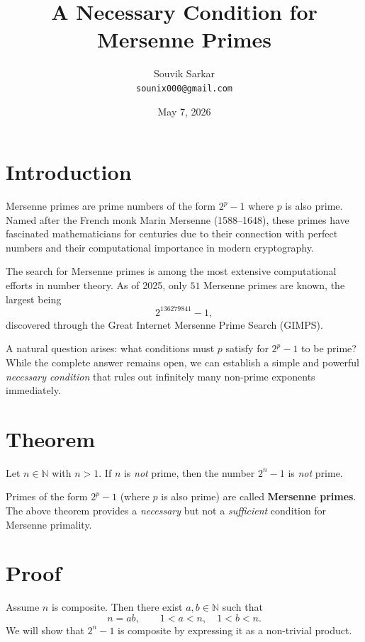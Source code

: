 \documentclass[11pt]{article}
\title{\textbf{A Necessary Condition for Mersenne Primes}}
\author{Souvik Sarkar \\ \texttt{sounix000@gmail.com}}
\date{May 7, 2026}
\begin{document}
\maketitle

\section*{Introduction}

Mersenne primes are prime numbers of the form $2^p - 1$ where $p$ is also prime. Named after the French monk Marin Mersenne (1588–1648), these primes have fascinated mathematicians for centuries due to their connection with perfect numbers and their computational importance in modern cryptography.

The search for Mersenne primes is among the most extensive computational efforts in number theory. As of 2025, only $51$ Mersenne primes are known, the largest being
\[
2^{136279841} - 1,
\]
discovered through the Great Internet Mersenne Prime Search (GIMPS).

A natural question arises: what conditions must $p$ satisfy for $2^p - 1$ to be prime? While the complete answer remains open, we can establish a simple and powerful \emph{necessary condition} that rules out infinitely many non-prime exponents immediately.

\section*{Theorem}

\begin{tcolorbox}[colback=blue!3!white, colframe=blue!60!black, title=\textbf{Main Theorem}]
Let $n \in \mathbb{N}$ with $n>1$. If $n$ is \emph{not} prime, then the number $2^n - 1$ is \emph{not} prime.
\end{tcolorbox}

\noindent
Primes of the form $2^p - 1$ (where $p$ is also prime) are called \textbf{Mersenne primes}. The above theorem provides a \emph{necessary} but not a \emph{sufficient} condition for Mersenne primality.

\section*{Proof}

Assume $n$ is composite. Then there exist $a,b \in \mathbb{N}$ such that
\[
n = a b, \qquad 1 < a < n, \quad 1 < b < n.
\]
We will show that $2^n - 1$ is composite by expressing it as a non-trivial product.
\end{document}
